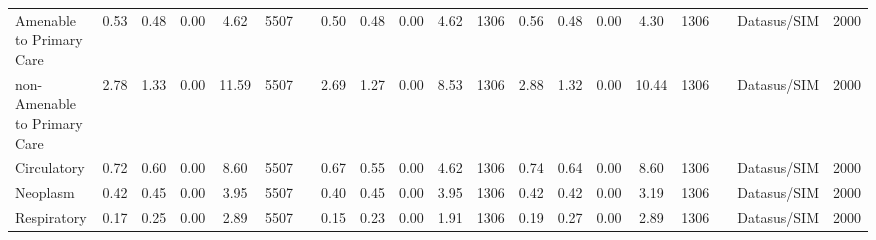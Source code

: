 \begin{sidewaystable}
\begin{table}[H]
\begin{footnotesize}
\begin{center}
{\begin{threeparttable}[b]
\begin{tabular}{rrrrrrrrrrrrrrrrrrrr}
    \multicolumn{1}{l}{Amenable to Primary Care} & \multicolumn{1}{c}{0.53} & \multicolumn{1}{c}{0.48} & \multicolumn{1}{c}{0.00} & \multicolumn{1}{c}{4.62} & \multicolumn{1}{c}{5507} &       & \multicolumn{1}{c}{0.50} & \multicolumn{1}{c}{0.48} & \multicolumn{1}{c}{0.00} & \multicolumn{1}{c}{4.62} & \multicolumn{1}{c}{1306} & \multicolumn{1}{c}{0.56} & \multicolumn{1}{c}{0.48} & \multicolumn{1}{c}{0.00} & \multicolumn{1}{c}{4.30} & \multicolumn{1}{c}{1306} &       & \multicolumn{1}{c}{Datasus/SIM} & \multicolumn{1}{c}{2000} \\
    \multicolumn{1}{l}{non-Amenable to Primary Care} & \multicolumn{1}{c}{2.78} & \multicolumn{1}{c}{1.33} & \multicolumn{1}{c}{0.00} & \multicolumn{1}{c}{11.59} & \multicolumn{1}{c}{5507} &       & \multicolumn{1}{c}{2.69} & \multicolumn{1}{c}{1.27} & \multicolumn{1}{c}{0.00} & \multicolumn{1}{c}{8.53} & \multicolumn{1}{c}{1306} & \multicolumn{1}{c}{2.88} & \multicolumn{1}{c}{1.32} & \multicolumn{1}{c}{0.00} & \multicolumn{1}{c}{10.44} & \multicolumn{1}{c}{1306} &       & \multicolumn{1}{c}{Datasus/SIM} & \multicolumn{1}{c}{2000} \\
    \multicolumn{1}{l}{Circulatory} & \multicolumn{1}{c}{0.72} & \multicolumn{1}{c}{0.60} & \multicolumn{1}{c}{0.00} & \multicolumn{1}{c}{8.60} & \multicolumn{1}{c}{5507} &       & \multicolumn{1}{c}{0.67} & \multicolumn{1}{c}{0.55} & \multicolumn{1}{c}{0.00} & \multicolumn{1}{c}{4.62} & \multicolumn{1}{c}{1306} & \multicolumn{1}{c}{0.74} & \multicolumn{1}{c}{0.64} & \multicolumn{1}{c}{0.00} & \multicolumn{1}{c}{8.60} & \multicolumn{1}{c}{1306} &       & \multicolumn{1}{c}{Datasus/SIM} & \multicolumn{1}{c}{2000} \\
    \multicolumn{1}{l}{Neoplasm} & \multicolumn{1}{c}{0.42} & \multicolumn{1}{c}{0.45} & \multicolumn{1}{c}{0.00} & \multicolumn{1}{c}{3.95} & \multicolumn{1}{c}{5507} &       & \multicolumn{1}{c}{0.40} & \multicolumn{1}{c}{0.45} & \multicolumn{1}{c}{0.00} & \multicolumn{1}{c}{3.95} & \multicolumn{1}{c}{1306} & \multicolumn{1}{c}{0.42} & \multicolumn{1}{c}{0.42} & \multicolumn{1}{c}{0.00} & \multicolumn{1}{c}{3.19} & \multicolumn{1}{c}{1306} &       & \multicolumn{1}{c}{Datasus/SIM} & \multicolumn{1}{c}{2000} \\
    \multicolumn{1}{l}{Respiratory} & \multicolumn{1}{c}{0.17} & \multicolumn{1}{c}{0.25} & \multicolumn{1}{c}{0.00} & \multicolumn{1}{c}{2.89} & \multicolumn{1}{c}{5507} &       & \multicolumn{1}{c}{0.15} & \multicolumn{1}{c}{0.23} & \multicolumn{1}{c}{0.00} & \multicolumn{1}{c}{1.91} & \multicolumn{1}{c}{1306} & \multicolumn{1}{c}{0.19} & \multicolumn{1}{c}{0.27} & \multicolumn{1}{c}{0.00} & \multicolumn{1}{c}{2.89} & \multicolumn{1}{c}{1306} &       & \multicolumn{1}{c}{Datasus/SIM} & \multicolumn{1}{c}{2000} \\

\end{tabular}
\end{threeparttable}}
\end{center}
\end{footnotesize}
\end{table}
\end{sidewaystable}
